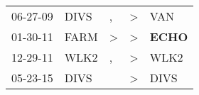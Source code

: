 \begin{supertabular}{p{0.07\textwidth}p{0.06\textwidth}p{0.02\textwidth}p{0.02\textwidth}p{0.06\textwidth}}
 06-27-09\textsuperscript{} &  DIVS\textsuperscript{} &             , &  \textgreater &            VAN\textsuperscript{} \\
 01-30-11\textsuperscript{} &  FARM\textsuperscript{} &  \textgreater &  \textgreater &  \textbf{ECHO\textsuperscript{}} \\
 12-29-11\textsuperscript{} &  WLK2\textsuperscript{} &             , &  \textgreater &           WLK2\textsuperscript{} \\
 05-23-15\textsuperscript{} &  DIVS\textsuperscript{} &               &  \textgreater &           DIVS\textsuperscript{} \\
\end{supertabular}
